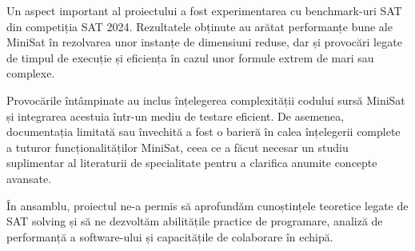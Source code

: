 \documentclass{llncs}
\begin{document}
Un aspect important al proiectului a fost experimentarea cu benchmark-uri SAT din competiția SAT 2024\cite{ref_SAT_Competition_home_page}. Rezultatele obținute au arătat performanțe bune ale MiniSat în rezolvarea unor instanțe de dimensiuni reduse, dar și provocări legate de timpul de execuție și eficiența în cazul unor formule extrem de mari sau complexe.

Provocările întâmpinate au inclus înțelegerea complexității codului sursă MiniSat și integrarea acestuia într-un mediu de testare eficient. De asemenea, documentația limitată sau învechită a fost o barieră în calea înțelegerii complete a tuturor funcționalităților MiniSat, ceea ce a făcut necesar un studiu suplimentar al literaturii de specialitate pentru a clarifica anumite concepte avansate.

În ansamblu, proiectul ne-a permis să aprofundăm cunoștințele teoretice legate de SAT solving și să ne dezvoltăm abilitățile practice de programare, analiză de performanță a software-ului și capacitățile de colaborare în echipă.
\end{document}
